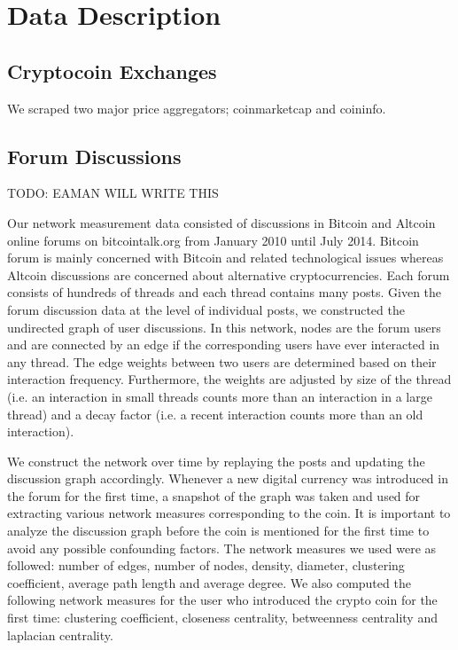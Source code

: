 \section{Data Description}

\subsection{Cryptocoin Exchanges}
We scraped two major price aggregators; coinmarketcap and coininfo.

\subsection{Forum Discussions}
TODO: EAMAN WILL WRITE THIS

Our network measurement data consisted of discussions in Bitcoin and Altcoin online forums on bitcointalk.org from January 2010 until July 2014. 
Bitcoin forum is mainly concerned with Bitcoin and related technological issues whereas Altcoin discussions are concerned about alternative cryptocurrencies. Each forum consists of hundreds of threads and each thread contains many posts.  Given the forum discussion data at the level of individual posts, we constructed the undirected graph of user discussions. In this network, nodes are the forum users and are connected by an edge if the corresponding users have ever interacted in any thread. The edge weights between two users are determined based on their interaction frequency. Furthermore, the weights are adjusted by size of the thread (i.e. an interaction in small threads counts more than an interaction in a large thread) and a decay factor (i.e. a recent interaction counts more than an old interaction).

We construct the network over time by replaying the posts and updating the discussion graph accordingly.  Whenever a new digital currency was introduced in the forum for the first time, a snapshot of the graph was taken and used for extracting various network measures corresponding to the coin. It is important to analyze the discussion graph before the coin is mentioned for the first time to avoid any possible confounding factors. The network measures we used were as followed: number of edges, number of nodes, density, diameter, clustering coefficient, average path length and average degree. We also computed the following network measures for the user who introduced the crypto coin for the first time: clustering coefficient, closeness centrality, betweenness centrality and laplacian centrality.

